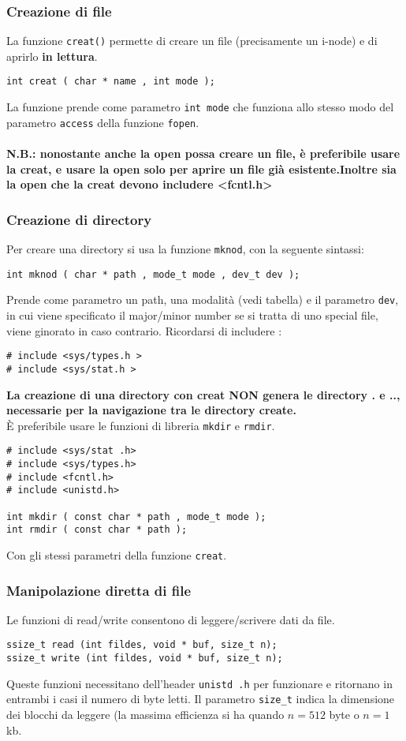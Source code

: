 \documentclass[a4paper, 10pt]{article}
\begin{document}
\subsubsection{Creazione di file}
La funzione \verb|creat()| permette di creare un file (precisamente un i-node) e di aprirlo \textbf{in lettura}.
\begin{verbatim}
int creat ( char * name , int mode );
\end{verbatim}
La funzione prende come parametro \verb|int mode| che funziona allo stesso modo del parametro \verb|access| della funzione \verb|fopen|.
\\ \\
\textbf{N.B.: nonostante anche la open possa creare un file, è preferibile usare la creat, e usare la open solo per aprire un file già esistente.Inoltre sia la open che la creat devono includere <fcntl.h>}

\subsubsection{Creazione di directory}
Per creare una directory si usa la funzione \verb|mknod|, con la seguente sintassi:
\begin{verbatim}
int mknod ( char * path , mode_t mode , dev_t dev );
\end{verbatim}
Prende come parametro un path, una modalità (vedi tabella) e il parametro \verb|dev|, in cui viene specificato il major/minor number se si tratta di uno special file, viene ginorato in caso contrario.
Ricordarsi di includere :
\begin{verbatim}
# include <sys/types.h >
# include <sys/stat.h >
\end{verbatim}


\textbf{La creazione di una directory con creat NON genera le directory . e .., necessarie per la navigazione tra le directory create.}\newline
\\
È preferibile usare le funzioni di libreria \verb|mkdir| e \verb|rmdir|.
\begin{verbatim}
# include <sys/stat .h>
# include <sys/types.h>
# include <fcntl.h>
# include <unistd.h>

int mkdir ( const char * path , mode_t mode );
int rmdir ( const char * path );
\end{verbatim}
Con gli stessi parametri della funzione \verb|creat|.

\subsubsection{Manipolazione diretta di file}
Le funzioni di read/write consentono di leggere/scrivere dati da file.
\begin{verbatim}
ssize_t read (int fildes, void * buf, size_t n);
ssize_t write (int fildes, void * buf, size_t n);
\end{verbatim}
Queste funzioni necessitano dell'header \verb|unistd .h| per funzionare e ritornano in entrambi i casi il numero di byte letti.
Il parametro \verb|size_t| indica la dimensione dei blocchi da leggere (la massima efficienza si ha quando $n=512$ byte o $n=1$ kb.
\end{document}
